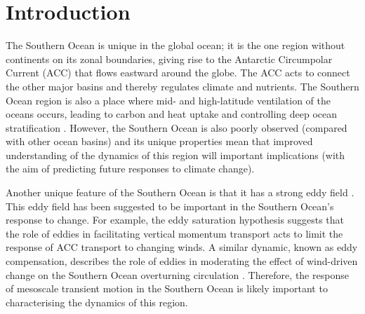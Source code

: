 \documentclass[linenumbers]{agujournal2019}
\begin{document}
%
%

\section{Introduction}

The Southern Ocean is unique in the global ocean; it is the one region without continents on its zonal boundaries, giving rise to the Antarctic Circumpolar Current (ACC) that flows eastward around the globe.
The ACC acts to connect the other major basins and thereby regulates climate and nutrients.
The Southern Ocean region is also a place where mid- and high-latitude ventilation of the oceans occurs, leading to carbon and heat uptake and controlling deep ocean stratification \citep{Rousselet2021, Morrison2022}.
However, the Southern Ocean is also poorly observed (compared with other ocean basins) and its unique properties mean that improved understanding of the dynamics of this region will important implications (with the aim of predicting future responses to climate change).

Another unique feature of the Southern Ocean is that it has a strong eddy field \citep{Fu2010}.
This eddy field has been suggested to be important in the Southern Ocean's response to change.
For example, the eddy saturation hypothesis \citep{Hallberg2006, Meredith-Hogg-2006, Munday2013, Constantinou2019} suggests that the role of eddies in facilitating vertical momentum transport acts to limit the response of ACC transport to changing winds.
A similar dynamic, known as eddy compensation, describes the role of eddies in moderating the effect of wind-driven change on the Southern Ocean overturning circulation \citep{Morrison2013a}.
Therefore, the response of mesoscale transient motion in the Southern Ocean is likely important to characterising the dynamics of this region.
\end{document}
